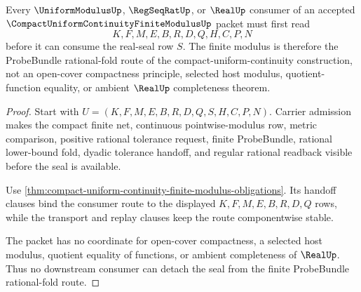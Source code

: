 \begin{theorem}
\label{thm:compact-uniform-continuity-finite-modulus-nonescape}
Every $\UniformModulusUp$, $\RegSeqRatUp$, or $\RealUp$ consumer of an accepted $\CompactUniformContinuityFiniteModulusUp$ packet must first read
$$
K,F,M,E,B,R,D,Q,H,C,P,N
$$
before it can consume the real-seal row $S$. The finite modulus is therefore the ProbeBundle rational-fold route of the compact-uniform-continuity construction, not an open-cover compactness principle, selected host modulus, quotient-function equality, or ambient $\RealUp$ completeness theorem.
\end{theorem}
\begin{proof}
Start with $U=(K,F,M,E,B,R,D,Q,S,H,C,P,N)$. Carrier admission makes the compact finite net, continuous pointwise-modulus row, metric comparison, positive rational tolerance request, finite ProbeBundle, rational lower-bound fold, dyadic tolerance handoff, and regular rational readback visible before the seal is available.

Use \autoref{thm:compact-uniform-continuity-finite-modulus-obligations}. Its handoff clauses bind the consumer route to the displayed $K,F,M,E,B,R,D,Q$ rows, while the transport and replay clauses keep the route componentwise stable.

The packet has no coordinate for open-cover compactness, a selected host modulus, quotient equality of functions, or ambient completeness of $\RealUp$. Thus no downstream consumer can detach the seal from the finite ProbeBundle rational-fold route.
\end{proof}



